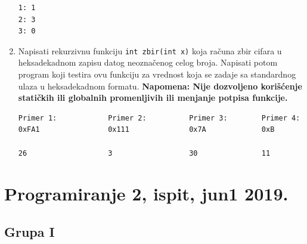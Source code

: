 \begin{enumerate}
\begin{verbatim}
1: 1
2: 3
3: 0
\end{verbatim}

\item  Napisati rekurzivnu funkciju {\tt int zbir(int x)} koja računa zbir
cifara u heksadekadnom zapisu datog neoznačenog celog broja. Napisati potom
program koji testira ovu funkciju za vrednost koja se zadaje sa standardnog
ulaza u heksadekadnom formatu.  {\bf Napomena: Nije dozvoljeno kori\v s\'cenje
stati\v ckih ili globalnih promenljivih ili menjanje potpisa funkcije.}
\begin{verbatim}
Primer 1:            Primer 2:          Primer 3:        Primer 4:
0xFA1                0x111              0x7A             0xB
 
26                   3                  30               11
\end{verbatim} 

\end{enumerate}

\section{Programiranje 2, ispit, jun1 2019.}
\subsection{Grupa I}

